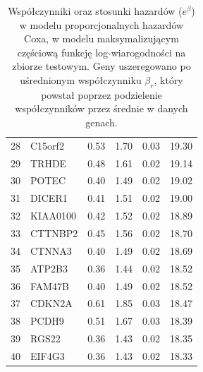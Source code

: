 \begin{table}[ht]
\begin{tabular}{rlrrrr}
  28 & C15orf2 & 0.53 & 1.70 & 0.03 & 19.30 \\ 
  29 & TRHDE & 0.48 & 1.61 & 0.02 & 19.14 \\ 
  30 & POTEC & 0.40 & 1.49 & 0.02 & 19.02 \\ 
  31 & DICER1 & 0.41 & 1.51 & 0.02 & 19.00 \\ 
  32 & KIAA0100 & 0.42 & 1.52 & 0.02 & 18.89 \\ 
  33 & CTTNBP2 & 0.45 & 1.56 & 0.02 & 18.70 \\ 
  34 & CTNNA3 & 0.40 & 1.49 & 0.02 & 18.69 \\ 
  35 & ATP2B3 & 0.36 & 1.44 & 0.02 & 18.52 \\ 
  36 & FAM47B & 0.40 & 1.49 & 0.02 & 18.52 \\ 
  37 & CDKN2A & 0.61 & 1.85 & 0.03 & 18.47 \\ 
  38 & PCDH9 & 0.51 & 1.67 & 0.03 & 18.39 \\ 
  39 & RGS22 & 0.36 & 1.43 & 0.02 & 18.35 \\ 
  40 & EIF4G3 & 0.36 & 1.43 & 0.02 & 18.33 \\ 
   \bottomrule
\end{tabular}
\caption{\label{tabelka}Współczynniki oraz stosunki hazardów ($e^{\beta}$) w modelu proporcjonalnych hazardów Coxa, w modelu maksymalizującym częściową funkcję log-wiarogodności na zbiorze testowym. Geny uszeregowano po uśrednionym współczynniku $\beta_{r}$, który powstał poprzez podzielenie współczynników przez średnie w danych genach.}
\end{table}
